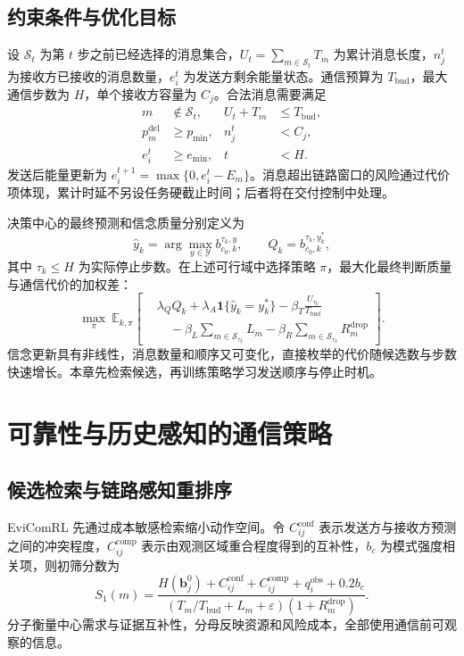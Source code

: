 \subsection{约束条件与优化目标}
设 $\mathcal S_t$ 为第 $t$ 步之前已经选择的消息集合，$U_t=\sum_{m\in\mathcal S_t}T_m$ 为累计消息长度，$n_j^t$ 为接收方已接收的消息数量，$e_i^t$ 为发送方剩余能量状态。通信预算为 $T_{\mathrm{bud}}$，最大通信步数为 $H$，单个接收方容量为 $C_j$。合法消息需要满足
\begin{equation}
\begin{aligned}
m&\notin\mathcal S_t, & U_t+T_m&\leq T_{\mathrm{bud}},\\
p_m^{\mathrm{del}}&\geq p_{\min}, & n_j^t&<C_j,\\
e_i^t&\geq e_{\min}, & t&<H.
\end{aligned}
\label{rq2:eq:constraints}
\end{equation}
发送后能量更新为 $e_i^{t+1}=\max\{0,e_i^t-E_m\}$。消息超出链路窗口的风险通过代价项体现，累计时延不另设任务硬截止时间；后者将在交付控制中处理。

决策中心的最终预测和信念质量分别定义为
\begin{equation}
\hat y_k=\arg\max_{y\in\mathcal Y} b_{c_0,k}^{\tau_k,y},\qquad
Q_k= b_{c_0,k}^{\tau_k,y_k^*},
\label{rq2:eq:quality}
\end{equation}
其中 $\tau_k\leq H$ 为实际停止步数。在上述可行域中选择策略 $\pi$，最大化最终判断质量与通信代价的加权差：
\begin{equation}
\max_{\pi}\ \mathbb E_{k,\pi}\!\left[
\begin{aligned}
&\lambda_Q Q_k+\lambda_A\mathbf1\{\hat y_k=y_k^*\}
-\beta_T\frac{U_{\tau_k}}{T_{\mathrm{bud}}}\\
&\hspace{1em}-\beta_L\sum_{m\in\mathcal S_{\tau_k}}L_m
-\beta_R\sum_{m\in\mathcal S_{\tau_k}}R_m^{\mathrm{drop}}
\end{aligned}\right].
\label{rq2:eq:objective}
\end{equation}
信念更新具有非线性，消息数量和顺序又可变化，直接枚举的代价随候选数与步数快速增长。本章先检索候选，再训练策略学习发送顺序与停止时机。

\section{可靠性与历史感知的通信策略}
\label{rq2:sec:algorithm}
\subsection{候选检索与链路感知重排序}
EviComRL 先通过成本敏感检索缩小动作空间。令 $C_{ij}^{\mathrm{conf}}$ 表示发送方与接收方预测之间的冲突程度，$C_{ij}^{\mathrm{comp}}$ 表示由观测区域重合程度得到的互补性，$b_c$ 为模式强度相关项，则初筛分数为
\begin{equation}
S_1(m)=\frac{H(\bm b_j^0)+C_{ij}^{\mathrm{conf}}+C_{ij}^{\mathrm{comp}}+q_i^{\mathrm{obs}}+0.2b_c}
{(T_m/T_{\mathrm{bud}}+L_m+\varepsilon)(1+R_m^{\mathrm{drop}})}.
\label{rq2:eq:retrieval}
\end{equation}
分子衡量中心需求与证据互补性，分母反映资源和风险成本，全部使用通信前可观察的信息。

